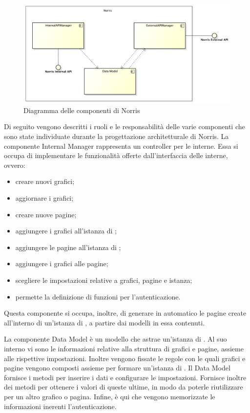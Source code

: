     	\begin{figure}[H]\centering
	        \includegraphics[width=\textwidth]{SpecificaTecnica/Pics/ComponentiNorris}
	        \caption{Diagramma delle componenti di Norris}
	    \end{figure}
    	Di seguito vengono descritti i ruoli e le responsabilità delle varie componenti che sono state individuate durante la progettazione architetturale di Norris.
			La componente Internal  Manager rappresenta un controller per le  interne. Essa si occupa di implementare le funzionalità offerte dall'interfaccia delle  interne, ovvero:
			\begin{itemize}
				\item creare nuovi grafici;
				\item aggiornare i grafici;
				\item creare nuove pagine;
				\item aggiungere i grafici all'istanza di ;
				\item aggiungere le pagine all'istanza di ;
				\item aggiungere i grafici alle pagine;
				\item scegliere le impostazioni relative a grafici, pagine e istanza;
				\item permette la definizione di funzioni per l'autenticazione.
			\end{itemize}
		Questa componente si occupa, inoltre, di generare in automatico le pagine create all'interno di un'istanza di , a partire dai modelli in essa contenuti.

			La componente Data Model è un modello che astrae un'istanza di . Al suo interno vi sono le informazioni relative alla struttura di grafici e pagine, assieme alle rispettive impostazioni. Inoltre vengono fissate le regole con le quali grafici e pagine vengono composti assieme per formare un'istanza di . Il Data Model fornisce i metodi per inserire i dati e configurare le impostazioni. Fornisce inoltre dei metodi per ottenere i valori di queste ultime, in modo da poterle riutilizzare per un altro grafico o pagina. Infine, è qui che vengono memorizzate le informazioni inerenti l'autenticazione.

